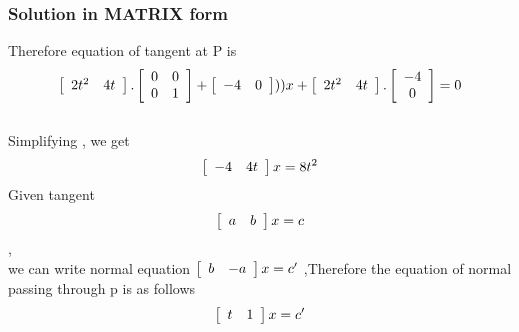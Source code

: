 \documentclass{beamer}
\begin{document}
\begin{frame}
\frametitle{Solution in MATRIX form}
Therefore equation of tangent at P is 
\[
\left[ 
  \begin{array}{ c c }
     2t^{2}&4t
     
  \end{array} \right ].\left[ 
  \begin{array}{ c c }
     0 & 0\\
     0 & 1
  \end{array} \right]+\left[ 
  \begin{array}{ c c }
     -4&0
  \end{array} \right]))x+\left[ 
  \begin{array}{ c c }
     2t^2&4t
     
  \end{array} \right].\left[ 
  \begin{array}{ c }
     -4\\
     0 
  \end{array} \right]=0
  \]
 \\  Simplifying , we get
 \[
  \left[ 
  \begin{array}{ c c }
     -4 &4t
  \end{array} \right]x=8t^2
  \]
Given tangent 
\[
\left[ 
  \begin{array}{ c c }
     a& b
  \end{array} \right]x=c
  \]
  ,\\we can write normal equation $\left[ 
  \begin{array}{ c c }
     b & -a
  \end{array} \right]x=c^{\prime}$
  ,Therefore the equation of normal passing through p is as follows
  \begin{equation*}
  \left[
  \begin{array}{c c}
  t&1\\
  \end{array}
  \right]x=c^{\prime}
  \end{equation*}

\end{frame}

\end{document}
